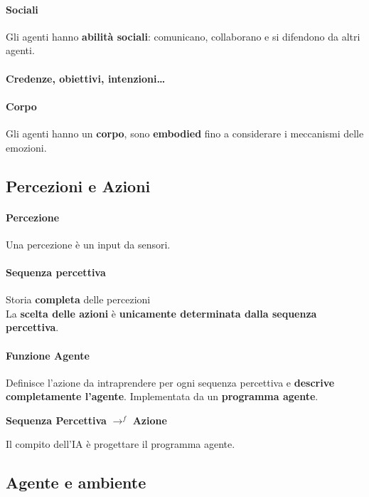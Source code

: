 \documentclass[10pt]{book}
\begin{document}
\paragraph{Sociali} Gli agenti hanno \textbf{abilità sociali}: comunicano, collaborano e si difendono da altri agenti.
\paragraph{Credenze, obiettivi, intenzioni\ldots}
\paragraph{Corpo} Gli agenti hanno un \textbf{corpo}, sono \textbf{embodied} fino a considerare i meccanismi delle emozioni.
\subsection{Percezioni e Azioni}
\paragraph{Percezione} Una percezione è un input da sensori.
\paragraph{Sequenza percettiva} Storia \textbf{completa} delle percezioni\\
La \textbf{scelta delle azioni} è \textbf{unicamente determinata dalla sequenza percettiva}.
\paragraph{Funzione Agente} Definisce l'azione da intraprendere per ogni sequenza percettiva e \textbf{descrive completamente l'agente}. Implementata da un \textbf{programma agente}.
\begin{center}
	\textbf{Sequenza Percettiva} $\longrightarrow^f$ \textbf{Azione}
\end{center}
Il compito dell'IA è progettare il programma agente.
\subsection{Agente e ambiente}
\end{document}
